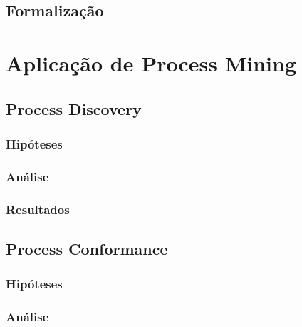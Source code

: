 \documentclass[a4paper]{article}
\begin{document}
\lipsum[10]
\lipsum[10]
\lipsum[10]
\lipsum[10]
\lipsum[10]

\subsection{Formalização}

\lipsum[10]
\lipsum[10]
\lipsum[10]
\lipsum[10]
\lipsum[10]

\section{Aplicação de Process Mining}

\cite{PM_book}
\lipsum[10]
\lipsum[10]
\lipsum[10]

\subsection{Process Discovery}

\lipsum[10]

\subsubsection{Hipóteses}
\lipsum[10]
\lipsum[10]
\lipsum[10]
\lipsum[10]
\subsubsection{Análise}
\lipsum[10]
\lipsum[10]
\lipsum[10]
\lipsum[10]
\lipsum[10]
\lipsum[10]
\subsubsection{Resultados}
\lipsum[10]
\lipsum[10]
\lipsum[10]
\lipsum[10]

\subsection{Process Conformance}

\lipsum[10]

\subsubsection{Hipóteses}
\lipsum[10]
\lipsum[10]
\lipsum[10]
\lipsum[10]
\subsubsection{Análise}
\lipsum[10]
\lipsum[10]
\lipsum[10]
\lipsum[10]
\end{document}
